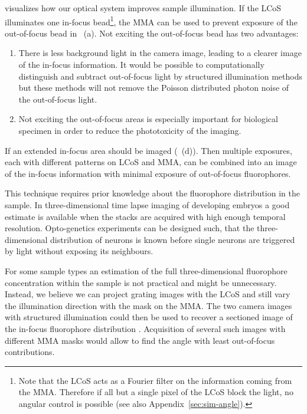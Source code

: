  visualizes how our optical system improves
sample illumination. If the LCoS illuminates one in-focus
bead\footnote{Note that the LCoS acts as a Fourier filter on the
  information coming from the MMA. Therefore if all but a single pixel
  of the LCoS block the light, no angular control is possible (see
  also Appendix~\ref{sec:sim-angle}).}, the MMA can be used to prevent
exposure of the out-of-focus bead in
~(a). Not exciting the out-of-focus bead has
two advantages:
\begin{enumerate}
\item There is less background light in the camera image, leading to a
  clearer image of the in-focus information. It would be possible to
  computationally distinguish and subtract out-of-focus light by
  structured illumination methods but these methods will not remove
  the Poisson distributed photon noise of the out-of-focus light.
\item Not exciting the out-of-focus areas is especially important for
  biological specimen in order to reduce the phototoxicity of the
  imaging.
\end{enumerate}
If an extended in-focus area should be imaged
(~(d)). Then multiple exposures, each with
different patterns on LCoS and MMA, can be combined into an image of
the in-focus information with minimal exposure of out-of-focus
fluorophores.

This technique requires prior knowledge about the fluorophore
distribution in the sample. In three-dimensional time lapse imaging of
developing embryos a good estimate is available when the stacks are
acquired with high enough temporal resolution. Opto-genetics
experiments can be designed such, that the three-dimensional
distribution of neurons is known before single neurons are triggered
by light without exposing its neighbours.

For some sample types an estimation of the full three-dimensional
fluorophore concentration within the sample is not practical and might
be unnecessary. Instead, we believe we can project grating images with
the LCoS and still vary the illumination direction with the mask on
the MMA. The two camera images with structured illumination could then
be used to recover a sectioned image of the in-focus fluorophore
distribution \citep{2008Lim,Bozinovic2008,2009Santos}. Acquisition of
several such images with different MMA masks would allow to find the
angle with least out-of-focus contributions.

